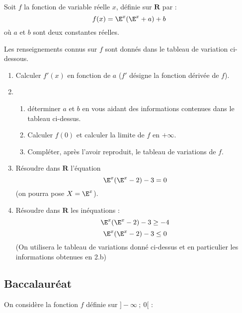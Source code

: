 \begin{tkzexample}
  Soit $f$ la fonction de variable réelle $x$, définie sur $\mathbf{R}$ par :
  \[
      f(x)=\E^x(\E^x+a)+b
  \]
  où $a$ et $b$ sont deux constantes réelles.

  Les renseignements connus sur $f$ sont donnés dans le tableau de variation ci-dessous.
   
  \medskip
  \begin{center}
  \end{center}

  \medskip
  \begin{enumerate}
      \item Calculer $f'(x)$ en fonction de $a$ ($f'$ désigne la fonction dérivée de $f$).
      \item \begin{enumerate}
             \item déterminer $a$ et $b$ en vous aidant des informations contenues dans le
              tableau ci-dessus.
             \item Calculer $f(0)$ et calculer la limite de $f$ en $+\infty$.
             \item Compléter, après l'avoir reproduit, le tableau de variations de $f$.
             \end{enumerate}
      \item Résoudre dans $\mathbf{R}$ l'équation 
      \[
          \E^x(\E^x-2)-3=0
      \]
      (on pourra pose $X=\E^x$).
      \item Résoudre dans $\mathbf{R}$ les inéquations : 
      \[
          \E^x(\E^x-2)-3\geq -4
      \]
      \[
          \E^x(\E^x-2)-3 \leq 0
      \]
       (On utilisera le tableau de variations donné ci-dessus et en particulier les
        informations obtenues en 2.b)
  \end{enumerate}
\end{tkzexample}


\subsection{Baccalauréat}
	On considère la fonction $f$ définie sur $]-\infty~;~0[$ :


